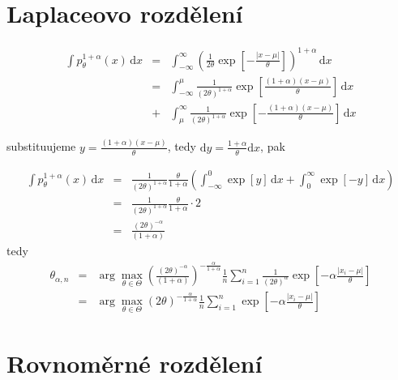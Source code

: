 \documentclass[11pt, a4paper]{article}
\newcommand{\intpa}{\int p_\theta^{1+\alpha}(x) \, \mathrm{d}x }
\newcommand{\amtiT}{\arg \max_{\theta \in \Theta}}
\begin{document}
\section{Laplaceovo rozdělení}

\begin{eqnarray}
\intpa & = & \int_{-\infty }^{\infty } \left( {\frac{1}{2\theta} \exp{ \left[ -\frac{|x -\mu |}{\theta } \right] }} \right) ^{1 + \alpha} \, \mathrm{d}x \nonumber\\
 & = & \int_{-\infty }^{\mu } {\frac{1}{ (2\theta)^{ 1 + \alpha}} \exp{ \left[ \frac{(1 + \alpha )(x -\mu )}{\theta } \right] }} \, \mathrm{d}x \nonumber\\
 & + & \int_{\mu }^{\infty } {\frac{1}{ (2\theta)^{ 1 + \alpha}} \exp{ \left[ -\frac{(1 + \alpha )(x -\mu )}{\theta } \right] }} \, \mathrm{d}x \nonumber
\end{eqnarray} 

substituujeme $ y = \frac{(1+\alpha)(x-\mu)}{\theta} $, tedy $\mathrm{d}y = \frac{1+\alpha}{\theta}\mathrm{d}x $, pak

\begin{eqnarray}
\intpa & = & \frac{1}{ (2\theta)^{ 1 + \alpha}} \frac{\theta}{1+\alpha} \left( 
\int_{-\infty }^{0 } {\exp{ \left[ y \right] }} \, \mathrm{d}x + 
\int_{0 }^{\infty } {\exp{ \left[ -y \right] }} \, \mathrm{d}x \right) \nonumber\\
& = & \frac{1}{ (2\theta)^{ 1 + \alpha}} \frac{\theta}{1+\alpha} \cdot 2  \nonumber\\
& = & \frac{(2\theta)^{-\alpha}}{(1+\alpha)} 
\end{eqnarray}
tedy 
\begin{eqnarray}
	\theta_{\alpha,n} &= &\amtiT \left( \frac{(2\theta)^{-\alpha}}{(1+\alpha)}  \right)^{-\frac{\alpha}{1+\alpha}} \frac{1}{n} \sum_{i=1}^n \frac{1}{(2\theta)^{\alpha}} \exp \left[-\alpha\frac{|x_i-\mu|}{\theta} \right] \nonumber\\
	&=& \amtiT (2\theta)^{-\frac{\alpha}{1+\alpha}} \frac{1}{n} \sum_{i=1}^n \exp \left[-\alpha\frac{|x_i-\mu|}{\theta} \right]
\end{eqnarray}


\section{Rovnoměrné rozdělení}
\end{document}
